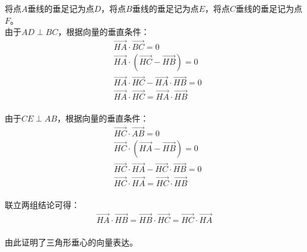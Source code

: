 \documentclass[UTF8]{ctexart}
\begin{document}
    将点$A$垂线的垂足记为点$D$，将点$B$垂线的垂足记为点$E$，将点$C$垂线的垂足记为点$F$。\\[3mm]
    由于$AD\perp BC$，根据向量的垂直条件：
    \begin{align}
        &\overrightarrow{HA}\cdot\overrightarrow{BC}=0\\[2mm]
        &\overrightarrow{HA}\cdot\left(\overrightarrow{HC}-\overrightarrow{HB}\right)=0\\[2mm]
        &\overrightarrow{HA}\cdot\overrightarrow{HC}-\overrightarrow{HA}\cdot\overrightarrow{HB}=0\\[2mm]
        &\overrightarrow{HA}\cdot\overrightarrow{HC}=\overrightarrow{HA}\cdot\overrightarrow{HB}
    \end{align}\\
    由于$CE\perp AB$，根据向量的垂直条件：
    \begin{align}
        &\overrightarrow{HC}\cdot\overrightarrow{AB}=0\\[2mm]
        &\overrightarrow{HC}\cdot\left(\overrightarrow{HA}-\overrightarrow{HB}\right)=0\\[2mm]
        &\overrightarrow{HC}\cdot\overrightarrow{HA}-\overrightarrow{HC}\cdot\overrightarrow{HB}=0\\[2mm]
        &\overrightarrow{HC}\cdot\overrightarrow{HA}=\overrightarrow{HC}\cdot\overrightarrow{HB}
    \end{align}\\
    联立两组结论可得：
    \begin{align}
        \overrightarrow{HA}\cdot\overrightarrow{HB}=\overrightarrow{HB}\cdot\overrightarrow{HC}=\overrightarrow{HC}\cdot\overrightarrow{HA}
    \end{align}\\
    由此证明了三角形垂心的向量表达。

\newpage
\end{document}
